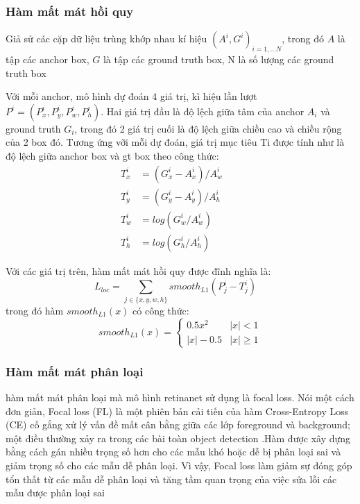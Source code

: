 \documentclass[a4paper, 12pt]{report}
\begin{document}
\subsubsection{Hàm mất mát hồi quy}
Giả sử các cặp dữ liệu trùng khớp nhau kí hiệu ${(A^i, G^i)}_{i=1,...N}$, trong đó $A$  là tập các anchor box, $G$ là tập các ground truth box, N là số lượng các ground truth box 

Với mỗi anchor, mô hình dự đoán 4 giá trị, kì hiệu lần lượt $P^i = (P^i_x, P^i_y, P^i_w, P^i_h)$. Hai giá trị đầu là độ lệch giữa tâm của anchor $A_{i}$ và ground truth $G_i$, trong đó 2 giá trị cuối là độ lệch giữa chiều cao và chiều rộng của 2 box đó. Tương ứng vỡi mỗi dự đoán, giá trị mục tiêu Ti được tính như là độ lệch giữa anchor box và gt box theo công thức:
\begin{align}
T^i_x &= (G^i_x - A^i_x) / A^i_w \quad & \\
T^i_y &= (G^i_y - A^i_y) / A^i_h & \\
T^i_w &= log(G^i_w / A^i_w) & \\
T^i_h &= log(G^i_h / A^i_h) &
\end{align}

Với các giá trị trên, hàm mất mát hồi quy được đĩnh nghĩa là:
\begin{equation}
	L_{loc} = \sum_{j \in \{x, y, w, h\}}smooth_{L1}(P^i_j - T^i_j) \quad
\end{equation}
trong đó hàm $smooth_{L1}(x)$ có công thức:
\begin{equation}
smooth_{L1}(x) = 
\begin{cases}
0.5x^2 &|x| < 1 \\
|x| - 0.5 &|x| \geq 1
\end{cases}
\end{equation}

\subsubsection{Hàm mất mát phân loại}
hàm mất mát phân loại mà mô hình retinanet sử dụng là focal loss. Nói một cách đơn giản, Focal loss (FL) là một phiên bản cải tiến của hàm Cross-Entropy Loss (CE) cố gắng xử lý vấn đề mất cân bằng giữa các lớp foreground và background; một điều thường xảy ra trong các bài toàn object detection .Hàm được xây dựng bằng cách gán nhiều trọng số hơn cho các mẫu khó hoặc dễ bị phân loại sai và giảm trọng số cho các mẫu dễ phân loại. Vì vậy, Focal loss làm giảm sự đóng góp tổn thất từ các mẫu dễ phân loại và tăng tầm quan trọng của việc sửa lỗi các mẫu được phân loại sai
\end{document}
